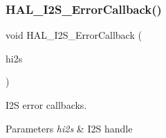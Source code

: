 \subsubsection{\texorpdfstring{H\+A\+L\+\_\+\+I2\+S\+\_\+\+Error\+Callback()}{HAL\_I2S\_ErrorCallback()}}
{\footnotesize\ttfamily void H\+A\+L\+\_\+\+I2\+S\+\_\+\+Error\+Callback (\begin{DoxyParamCaption}\item[{I2\+S\+\_\+\+Handle\+Type\+Def $\ast$}]{hi2s }\end{DoxyParamCaption})}



I2S error callbacks. 


\begin{DoxyParams}{Parameters}
{\em hi2s} & I2S handle \\
\hline
\end{DoxyParams}
